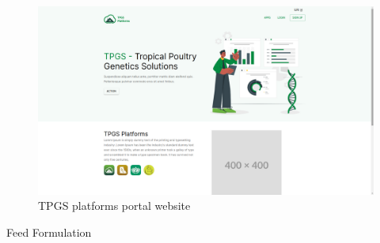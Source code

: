 \documentclass[12pt]{extarticle}
\begin{document}
\begin{figure}[!ht]
\centering
\hspace*{-3cm}
\includegraphics[width=20cm,keepaspectratio]{1.png}
\caption{TPGS platforms portal website}
\end{figure}

\pagebreak

Feed Formulation
\end{document}

